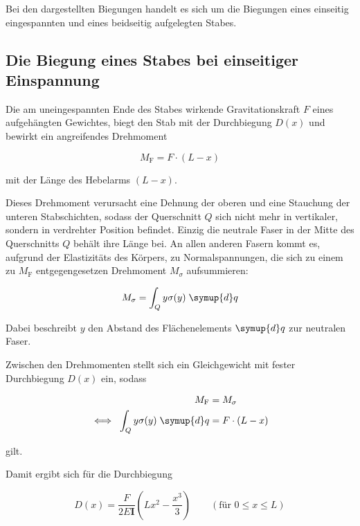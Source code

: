 Bei den dargestellten Biegungen handelt es sich um die Biegungen eines einseitig
eingespannten und eines beidseitig aufgelegten Stabes.

\subsection{Die Biegung eines Stabes bei einseitiger Einspannung}

Die am uneingespannten Ende des Stabes wirkende Gravitationskraft $F$ eines 
aufgehängten Gewichtes, biegt den Stab mit der Durchbiegung $D(x)$ und
bewirkt ein angreifendes Drehmoment

\begin{equation}
    M_\text{F} = F \cdot (L - x)
\end{equation}

mit der Länge des Hebelarms $(L - x)$.

Dieses Drehmoment verursacht eine Dehnung der oberen und eine Stauchung
der unteren Stabschichten, sodass der Querschnitt $Q$ sich nicht mehr in vertikaler,
sondern in verdrehter Position befindet. Einzig die neutrale Faser in der Mitte
des Querschnitts $Q$ behält ihre Länge bei. An allen anderen Fasern kommt es,
aufgrund der Elastizitäts des Körpers, zu Normalspannungen, die sich zu einem
zu $M_\text{F}$ entgegengesetzen Drehmoment $M_\sigma$ aufsummieren:

\begin{equation}
    M_\sigma = \int_Q y \sigma(y) \; \symup{d}q
\end{equation}

Dabei beschreibt $y$ den Abstand des Flächenelements $\symup{d}q$ zur neutralen Faser.

Zwischen den Drehmomenten stellt sich ein Gleichgewicht mit fester
Durchbiegung $D(x)$ ein, sodass 

\begin{align}
    M_\text{F} &= M_\sigma \\
    \iff \; \int_Q y \sigma(y) \; \symup{d}q &= F \cdot (L - x)
\end{align}

gilt.

Damit ergibt sich für die Durchbiegung

\begin{equation}
    D(x) = \frac{F}{2 E \symbf{I}} \left(L x^2 - \frac{x^3}{3} \right) 
    \qquad (\text{für } 0 \leq x \leq L)
    \label{eqn:Biegung}
\end{equation}

